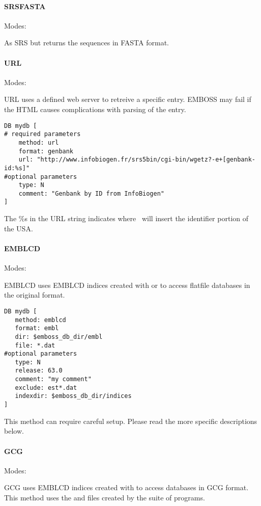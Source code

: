 \documentclass{report}
\begin{document}
\paragraph{SRSFASTA}\par\noindent
Modes: \par\noindent
As SRS but returns the sequences in FASTA format.\\

\paragraph{URL}\par\noindent
Modes: \par\noindent
URL uses a defined web server to retreive a specific entry. EMBOSS may fail if the HTML causes complications with parsing of the entry. 

\begin{verbatim}
DB mydb [
# required parameters
    method: url
    format: genbank
    url: "http://www.infobiogen.fr/srs5bin/cgi-bin/wgetz?-e+[genbank-id:%s]"
#optional parameters
    type: N
    comment: "Genbank by ID from InfoBiogen"
]
\end{verbatim}
The \%s in the URL string indicates where \EMBOSS\ will insert the identifier portion of the USA.

\paragraph{EMBLCD}\par\noindent
Modes: \par\noindent
EMBLCD uses EMBLCD indices created with  or  to access flatfile databases in the original format.

\begin{verbatim}
DB mydb [
   method: emblcd
   format: embl
   dir: $emboss_db_dir/embl
   file: *.dat
#optional parameters
   type: N
   release: 63.0
   comment: "my comment"
   exclude: est*.dat
   indexdir: $emboss_db_dir/indices
]
\end{verbatim}
This method can require careful setup. Please read the more specific descriptions below.

\paragraph{GCG}\par\noindent
Modes: \par\noindent
GCG uses EMBLCD indices created with  to access databases in GCG format. This method uses the  and  files created by the  suite of programs.
\end{document}
